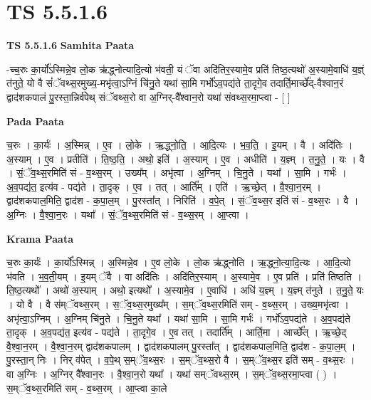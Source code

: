 \documentclass[17pt]{extarticle}
\begin{document}
\section{ TS 5.5.1.6 }

\textbf{TS 5.5.1.6 } \newline
\textbf{Samhita Paata} \newline

-च्च॒रुः का॒र्यो᳚ऽस्मिन्ने॒व लो॒क ऋ॑द्ध्नोत्यादि॒त्यो भ॑वती॒ यं ॅवा अदि॑तिर॒स्यामे॒व प्रति॑ तिष्ठ॒त्यथो॑ अ॒स्यामे॒वाधि॑ य॒ज्ञ्ं त॑नुते॒ यो वै सं॑ॅवथ्स॒रमुख्य॒-मभृ॑त्वा॒ऽग्निं चि॑नु॒ते यथा॑ सा॒मि गर्भो॑ऽव॒पद्य॑ते ता॒दृगे॒व तदार्ति॒मार्च्छे᳚द्-वैश्वान॒रं द्वाद॑शकपालं पु॒रस्ता॒न्निर्व॑पेथ् संॅवथ्स॒रो वा अ॒ग्निर्-वै᳚श्वान॒रो यथा॑ संवथ्स॒रमा॒प्त्वा - [  ] \newline

\textbf{Pada Paata} \newline

च॒रुः । का॒र्यः॑ । अ॒स्मिन्न् । ए॒व । लो॒के । ऋ॒द्ध्नो॒ति॒ । आ॒दि॒त्यः । भ॒व॒ति॒ । इ॒यम् । वै । अदि॑तिः । अ॒स्याम् । ए॒व । प्रतीति॑ । ति॒ष्ठ॒ति॒ । अथो॒ इति॑ । अ॒स्याम् । ए॒व । अधीति॑ । य॒ज्ञ्म् । त॒नु॒ते॒ । यः । वै । सं॒ॅव॒थ्स॒रमिति॑ सं - व॒थ्स॒रम् । उख्य᳚म् । अभृ॑त्वा । अ॒ग्निम् । चि॒नु॒ते । यथा᳚ । सा॒मि । गर्भः॑ । अ॒व॒पद्य॑त॒ इत्य॑व - पद्य॑ते । ता॒दृक् । ए॒व । तत् । आर्ति᳚म् । एति॑ । ऋ॒च्छे॒त् । वै॒श्वा॒न॒रम् । द्वाद॑शकपाल॒मिति॒ द्वाद॑श - क॒पा॒ल॒म् । पु॒रस्ता᳚त् । निरिति॑ । व॒पे॒त् । सं॒ॅव॒थ्स॒र इति॑ सं - व॒थ्स॒रः । वै । अ॒ग्निः । वै॒श्वा॒न॒रः । यथा᳚ । सं॒ॅव॒थ्स॒रमिति॑ सं - व॒थ्स॒रम् । आ॒प्त्वा ।  \newline


\textbf{Krama Paata} \newline

च॒रुः का॒र्यः॑ । का॒र्यो᳚ऽस्मिन्न् । अ॒स्मिन्ने॒व । ए॒व लो॒के । लो॒क ऋ॑द्ध्नोति । ऋ॒द्ध्नो॒त्या॒दि॒त्यः । आ॒दि॒त्यो भ॑वति । भ॒व॒ती॒यम् । इ॒यम् ॅवै । वा अदि॑तिः । अदि॑तिर॒स्याम् । अ॒स्यामे॒व । ए॒व प्रति॑ । प्रति॑ तिष्ठति । ति॒ष्ठ॒त्यथो᳚ । अथो॑ अ॒स्याम् । अथो॒ इत्यथो᳚ । अ॒स्यामे॒व । ए॒वाधि॑ । अधि॑ य॒ज्ञ्म् । य॒ज्ञ्म् त॑नुते । त॒नु॒ते॒ यः । यो वै । वै स॑म्ॅवथ्स॒रम् । स॒ॅव॒थ्स॒रमुख्य᳚म् । स॒म्ॅव॒थ्स॒रमिति॑ सम् - व॒थ्स॒रम् । उख्य॒मभृ॑त्वा । अभृ॑त्वा॒ऽग्निम् । अ॒ग्निम् चि॑नु॒ते । चि॒नु॒ते यथा᳚ । यथा॑ सा॒मि । सा॒मि गर्भः॑ । गर्भो॑ऽव॒पद्य॑ते । अ॒व॒पद्य॑ते ता॒दृक् । अ॒व॒पद्य॑त॒ इत्य॑व - पद्य॑ते । ता॒दृगे॒व । ए॒व तत् । तदार्ति᳚म् । आर्ति॒मा । आर्च्छे᳚त् । ऋ॒च्छे॒द् वै॒श्वा॒न॒रम् । वै॒श्वा॒न॒रम् द्वाद॑शकपालम् । द्वाद॑शकपालम् पु॒रस्ता᳚त् । द्वाद॑शकपाल॒मिति॒ द्वाद॑श - क॒पा॒ल॒म् । पु॒रस्ता॒न् निः । निर् व॑पेत् । व॒पे॒थ् स॒म्ॅव॒थ्स॒रः । स॒म्ॅव॒थ्स॒रो वै । स॒म्ॅव॒थ्स॒र इति॑ सम् - व॒थ्स॒रः । वा अ॒ग्निः । अ॒ग्निर् वै᳚श्वान॒रः । वै॒श्वा॒न॒रो यथा᳚ । यथा॑ सम्ॅवथ्स॒रम् । स॒म्ॅव॒थ्स॒रमा॒प्त्वा ( ) । स॒म्ॅव॒थ्स॒रमिति॑ सम् - व॒थ्स॒रम् । आ॒प्त्वा का॒ले \newline
\end{document}
